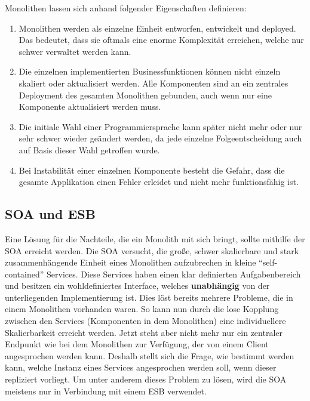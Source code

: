 \begin{definition}[Monolith]
	Monolithen lassen sich anhand folgender Eigenschaften definieren: \autocite[S. 3]{microservice_enterprise}
	\begin{enumerate}
		\item Monolithen werden als einzelne Einheit entworfen, entwickelt und deployed. Das bedeutet, dass sie oftmals eine enorme Komplexität erreichen, welche nur schwer verwaltet werden kann.
		\item Die einzelnen implementierten Businessfunktionen können nicht einzeln skaliert oder aktualisiert werden. Alle Komponenten sind an ein zentrales Deployment des gesamten Monolithen gebunden, auch wenn nur eine Komponente aktualisiert werden muss.
		\item Die initiale Wahl einer Programmiersprache kann später nicht mehr oder nur sehr schwer wieder geändert werden, da jede einzelne Folgeentscheidung auch auf Basis dieser Wahl getroffen wurde.
		\item Bei Instabilität einer einzelnen Komponente besteht die Gefahr, dass die gesamte Applikation einen Fehler erleidet und nicht mehr funktionsfähig ist.
	\end{enumerate}
\end{definition}

\subsection{SOA und ESB}

Eine Lösung für die Nachteile, die ein Monolith mit sich bringt, sollte mithilfe der \ac{SOA} erreicht werden. Die \ac{SOA} versucht, die große, schwer skalierbare und stark zusammenhängende Einheit eines Monolithen aufzubrechen in kleine \enquote{self-contained} Services. Diese Services haben einen klar definierten Aufgabenbereich und besitzen ein wohldefiniertes Interface, welches \textbf{unabhängig} von der unterliegenden Implementierung ist. Dies löst bereits mehrere Probleme, die in einem Monolithen vorhanden waren. So kann nun durch die lose Kopplung zwischen den Services (Komponenten in dem Monolithen) eine individuellere Skalierbarkeit erreicht werden. Jetzt steht aber nicht mehr nur ein zentraler Endpunkt wie bei dem Monolithen zur Verfügung, der von einem Client angesprochen werden kann. Deshalb stellt sich die Frage, wie bestimmt werden kann, welche Instanz eines Services angesprochen werden soll, wenn dieser repliziert vorliegt. Um unter anderem dieses Problem zu lösen, wird die \ac{SOA} meistens nur in Verbindung mit einem \ac{ESB} verwendet.

